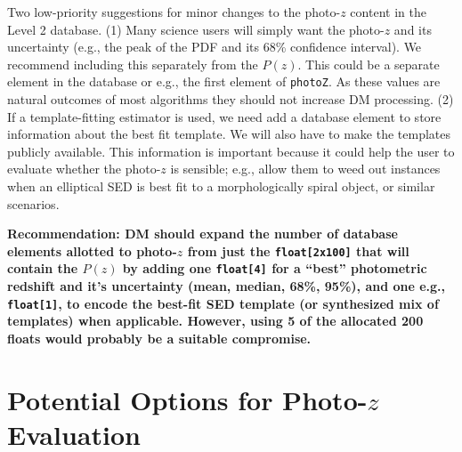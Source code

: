 \documentclass[DM,lsstdraft,toc]{lsstdoc}
\begin{document}
Two low-priority suggestions for minor changes to the photo-$z$ content in the Level 2 database. (1) Many science users will simply want the photo-$z$ and its uncertainty (e.g., the peak of the PDF and its 68\% confidence interval). We recommend including this separately from the $P(z)$. This could be a separate element in the database or e.g., the first element of \texttt{photoZ}. As these values are natural outcomes of most algorithms they should not increase DM processing. (2) If a template-fitting estimator is used, we need add a database element to store information about the best fit template. We will also have to make the templates publicly available. This information is important because it could help the user to evaluate whether the photo-$z$ is sensible; e.g., allow them to weed out instances when an elliptical SED is best fit to a morphologically spiral object, or similar scenarios.

\textbf{Recommendation: DM should expand the number of database elements allotted to photo-$z$ from just the \texttt{float[2x100]} that will contain the $P(z)$ by adding one \texttt{float[4]} for a ``best'' photometric redshift and it's uncertainty (mean, median, 68\%, 95\%), and one e.g., \texttt{float[1]}, to encode the best-fit SED template (or synthesized mix of templates) when applicable. However, using 5 of the allocated 200 floats would probably be a suitable compromise.}



\section{Potential Options for Photo-$z$ Evaluation}\label{sec:options}
\end{document}
